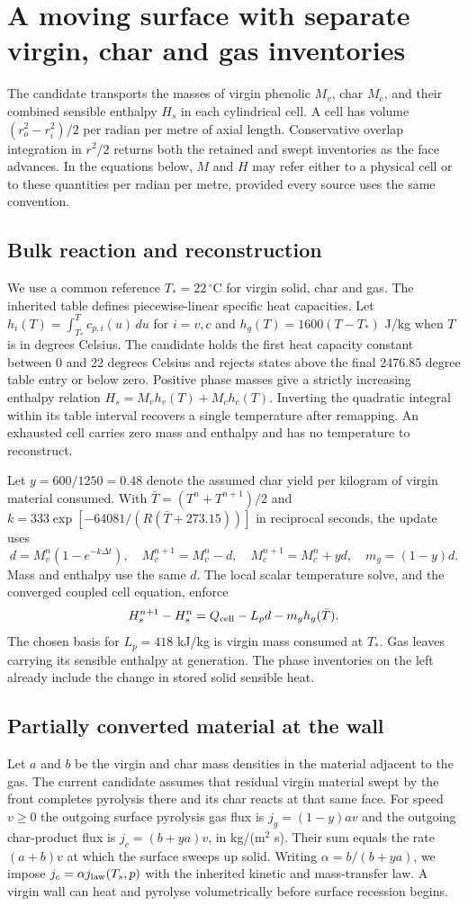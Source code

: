 \section{A moving surface with separate virgin, char and gas inventories}
The candidate transports the masses of virgin phenolic $M_v$, char $M_c$, and
their combined sensible enthalpy $H_s$ in each cylindrical cell. A cell has
volume $(r_o^2-r_i^2)/2$ per radian per metre of axial length. Conservative
overlap integration in $r^2/2$ returns both the retained and swept inventories
as the face advances. In the equations below, $M$ and $H$ may refer either to
a physical cell or to these quantities per radian per metre, provided every
source uses the same convention.

\subsection{Bulk reaction and reconstruction}
We use a common reference $T_*=22\,{}^\circ$C for virgin solid, char and gas.
The inherited table defines piecewise-linear specific heat capacities. Let
$h_i(T)=\int_{T_*}^T c_{p,i}(u)\,du$ for $i=v,c$ and
$h_g(T)=1600(T-T_*)$ J/kg when $T$ is in degrees Celsius. The candidate
holds the first heat capacity constant between 0 and 22 degrees Celsius and
rejects states above the final 2476.85 degree table entry or below zero.
Positive phase masses give a strictly increasing enthalpy relation
$H_s=M_vh_v(T)+M_ch_c(T)$. Inverting the quadratic integral within its
table interval recovers a single temperature after remapping. An exhausted
cell carries zero mass and enthalpy and has no temperature to reconstruct.

Let $y=600/1250=0.48$ denote the assumed char yield per kilogram of virgin
material consumed. With $\bar T=(T^n+T^{n+1})/2$ and $k=333\exp[-64081/
(R(\bar T+273.15))]$ in reciprocal seconds, the update uses
\[
 d=M_v^n(1-e^{-k\Delta t}),\quad
 M_v^{n+1}=M_v^n-d,\quad M_c^{n+1}=M_c^n+yd,\quad m_g=(1-y)d .
\]
Mass and enthalpy use the same $d$. The local scalar temperature solve, and the converged coupled cell equation, enforce
\[
 H_s^{n+1}-H_s^n=Q_{\rm cell}-L_p d-m_g h_g(\bar T).
\]
The chosen basis for $L_p=418$ kJ/kg is virgin mass consumed at $T_*$. Gas
leaves carrying its sensible enthalpy at generation. The phase inventories on
the left already include the change in stored solid sensible heat.

\subsection{Partially converted material at the wall}
Let $a$ and $b$ be the virgin and char mass densities in the material adjacent
to the gas. The current candidate assumes that residual virgin material swept
by the front completes pyrolysis there and its char reacts at that same face.
For speed $v\geq0$ the outgoing surface pyrolysis gas flux is $j_g=(1-y)av$
and the outgoing char-product flux is $j_c=(b+ya)v$, in kg/(m$^2$ s).
Their sum equals the rate $(a+b)v$ at which the surface sweeps up solid.
Writing $\alpha=b/(b+ya)$, we impose $j_c=\alpha j_{\rm law}(T_s,p)$ with
the inherited kinetic and mass-transfer law. A virgin wall can heat and
pyrolyse volumetrically before surface recession begins.

